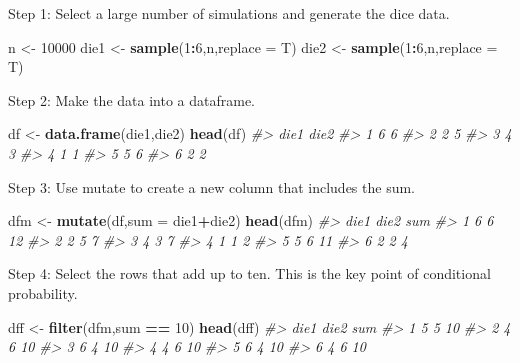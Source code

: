\documentclass[
]{book}
\newenvironment{Shaded}{\begin{snugshade}}{\end{snugshade}}
\newcommand{\AttributeTok}[1]{\textcolor[rgb]{0.13,0.29,0.53}{#1}}
\newcommand{\CommentTok}[1]{\textcolor[rgb]{0.56,0.35,0.01}{\textit{#1}}}
\newcommand{\DecValTok}[1]{\textcolor[rgb]{0.00,0.00,0.81}{#1}}
\newcommand{\FunctionTok}[1]{\textcolor[rgb]{0.13,0.29,0.53}{\textbf{#1}}}
\newcommand{\NormalTok}[1]{#1}
\newcommand{\OtherTok}[1]{\textcolor[rgb]{0.56,0.35,0.01}{#1}}
\newcommand{\SpecialCharTok}[1]{\textcolor[rgb]{0.81,0.36,0.00}{\textbf{#1}}}
\theoremstyle{definition}
\theoremstyle{definition}
\theoremstyle{definition}
\theoremstyle{definition}
\theoremstyle{remark}
\begin{document}
Step 1: Select a large number of simulations and generate the dice data.

\begin{Shaded}
\begin{Highlighting}[]
\NormalTok{n }\OtherTok{\textless{}{-}} \DecValTok{10000}
\NormalTok{die1 }\OtherTok{\textless{}{-}} \FunctionTok{sample}\NormalTok{(}\DecValTok{1}\SpecialCharTok{:}\DecValTok{6}\NormalTok{,n,}\AttributeTok{replace =}\NormalTok{ T)}
\NormalTok{die2 }\OtherTok{\textless{}{-}} \FunctionTok{sample}\NormalTok{(}\DecValTok{1}\SpecialCharTok{:}\DecValTok{6}\NormalTok{,n,}\AttributeTok{replace =}\NormalTok{ T)}
\end{Highlighting}
\end{Shaded}

Step 2: Make the data into a dataframe.

\begin{Shaded}
\begin{Highlighting}[]
\NormalTok{df }\OtherTok{\textless{}{-}} \FunctionTok{data.frame}\NormalTok{(die1,die2)}
\FunctionTok{head}\NormalTok{(df)}
\CommentTok{\#\textgreater{}   die1 die2}
\CommentTok{\#\textgreater{} 1    6    6}
\CommentTok{\#\textgreater{} 2    2    5}
\CommentTok{\#\textgreater{} 3    4    3}
\CommentTok{\#\textgreater{} 4    1    1}
\CommentTok{\#\textgreater{} 5    5    6}
\CommentTok{\#\textgreater{} 6    2    2}
\end{Highlighting}
\end{Shaded}

Step 3: Use mutate to create a new column that includes the sum.

\begin{Shaded}
\begin{Highlighting}[]
\NormalTok{dfm }\OtherTok{\textless{}{-}} \FunctionTok{mutate}\NormalTok{(df,}\AttributeTok{sum =}\NormalTok{ die1}\SpecialCharTok{+}\NormalTok{die2)}
\FunctionTok{head}\NormalTok{(dfm)}
\CommentTok{\#\textgreater{}   die1 die2 sum}
\CommentTok{\#\textgreater{} 1    6    6  12}
\CommentTok{\#\textgreater{} 2    2    5   7}
\CommentTok{\#\textgreater{} 3    4    3   7}
\CommentTok{\#\textgreater{} 4    1    1   2}
\CommentTok{\#\textgreater{} 5    5    6  11}
\CommentTok{\#\textgreater{} 6    2    2   4}
\end{Highlighting}
\end{Shaded}

Step 4: Select the rows that add up to ten. This is the key point of conditional probability.

\begin{Shaded}
\begin{Highlighting}[]
\NormalTok{dff }\OtherTok{\textless{}{-}} \FunctionTok{filter}\NormalTok{(dfm,sum }\SpecialCharTok{==} \DecValTok{10}\NormalTok{)}
\FunctionTok{head}\NormalTok{(dff)}
\CommentTok{\#\textgreater{}   die1 die2 sum}
\CommentTok{\#\textgreater{} 1    5    5  10}
\CommentTok{\#\textgreater{} 2    4    6  10}
\CommentTok{\#\textgreater{} 3    6    4  10}
\CommentTok{\#\textgreater{} 4    4    6  10}
\CommentTok{\#\textgreater{} 5    6    4  10}
\CommentTok{\#\textgreater{} 6    4    6  10}
\end{Highlighting}
\end{Shaded}
\end{document}
